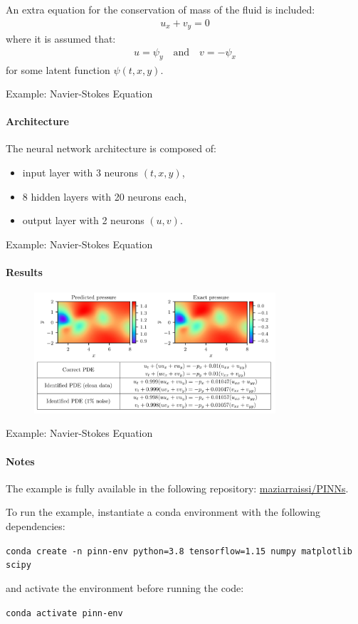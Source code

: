     \begin{frame}
    An extra equation for the conservation of mass of the fluid is included:
    \begin{align}
        u_x + v_y = 0
    \end{align}
    where it is assumed that:
    \begin{align}
    u = \psi_y \quad \text{and} \quad v = -\psi_x
    \end{align}
    for some latent function \( \psi(t, x, y) \).
    \end{frame}
    
    \begin{frame}{Example: Navier-Stokes Equation}
    \framesubtitle{Architecture}
    The neural network architecture is composed of:
    \begin{itemize}
        \item input layer with 3 neurons \((t, x, y)\),
        \item 8 hidden layers with 20 neurons each,
        \item output layer with 2 neurons \((u, v)\).
    \end{itemize}
    \end{frame}
    
    \begin{frame}{Example: Navier-Stokes Equation}
    \framesubtitle{Results}
    \begin{figure}[H]
        \centering
        \includegraphics[width=0.8\textwidth]{img/navier-results.png}
    \end{figure}
    \end{frame}
    
    \begin{frame}{Example: Navier-Stokes Equation}
    \framesubtitle{Notes}
    The example is fully available in the following repository:
    \href{https://github.com/maziarraissi/PINNs}{maziarraissi/PINNs}.
    
    To run the example, instantiate a conda environment with the following dependencies:
    
    \texttt{conda create -n pinn-env python=3.8 tensorflow=1.15 numpy matplotlib scipy}
    
    and activate the environment before running the code:
    
    \texttt{conda activate pinn-env}
    \end{frame}
    
